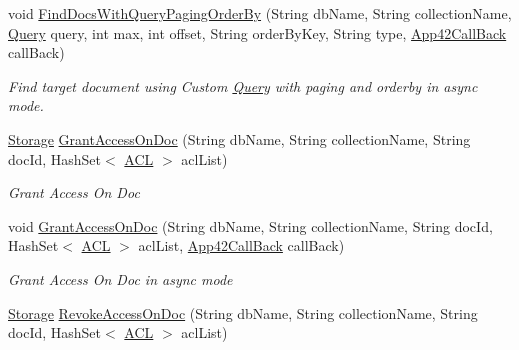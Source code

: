 \begin{DoxyCompactItemize}
void \hyperlink{classcom_1_1shephertz_1_1app42_1_1paas_1_1sdk_1_1csharp_1_1storage_1_1_storage_service_ad7cb126897b5cfe304cfaa0e12b5fb1d}{Find\+Docs\+With\+Query\+Paging\+Order\+By} (String db\+Name, String collection\+Name, \hyperlink{classcom_1_1shephertz_1_1app42_1_1paas_1_1sdk_1_1csharp_1_1storage_1_1_query}{Query} query, int max, int offset, String order\+By\+Key, String type, \hyperlink{interfacecom_1_1shephertz_1_1app42_1_1paas_1_1sdk_1_1csharp_1_1_app42_call_back}{App42\+Call\+Back} call\+Back)
\begin{DoxyCompactList}\small\item\em Find target document using Custom \hyperlink{classcom_1_1shephertz_1_1app42_1_1paas_1_1sdk_1_1csharp_1_1storage_1_1_query}{Query} with paging and orderby in async mode. \end{DoxyCompactList}\item 
\hyperlink{classcom_1_1shephertz_1_1app42_1_1paas_1_1sdk_1_1csharp_1_1storage_1_1_storage}{Storage} \hyperlink{classcom_1_1shephertz_1_1app42_1_1paas_1_1sdk_1_1csharp_1_1storage_1_1_storage_service_a73f8bafa03319566ef4f2f8801e62107}{Grant\+Access\+On\+Doc} (String db\+Name, String collection\+Name, String doc\+Id, Hash\+Set$<$ \hyperlink{classcom_1_1shephertz_1_1app42_1_1paas_1_1sdk_1_1csharp_1_1_a_c_l}{A\+C\+L} $>$ acl\+List)
\begin{DoxyCompactList}\small\item\em Grant Access On Doc \end{DoxyCompactList}\item 
void \hyperlink{classcom_1_1shephertz_1_1app42_1_1paas_1_1sdk_1_1csharp_1_1storage_1_1_storage_service_a85308841633067c2e26c16d51d6cf931}{Grant\+Access\+On\+Doc} (String db\+Name, String collection\+Name, String doc\+Id, Hash\+Set$<$ \hyperlink{classcom_1_1shephertz_1_1app42_1_1paas_1_1sdk_1_1csharp_1_1_a_c_l}{A\+C\+L} $>$ acl\+List, \hyperlink{interfacecom_1_1shephertz_1_1app42_1_1paas_1_1sdk_1_1csharp_1_1_app42_call_back}{App42\+Call\+Back} call\+Back)
\begin{DoxyCompactList}\small\item\em Grant Access On Doc in async mode \end{DoxyCompactList}\item 
\hyperlink{classcom_1_1shephertz_1_1app42_1_1paas_1_1sdk_1_1csharp_1_1storage_1_1_storage}{Storage} \hyperlink{classcom_1_1shephertz_1_1app42_1_1paas_1_1sdk_1_1csharp_1_1storage_1_1_storage_service_a911020eee695751f6eef2227292ab19e}{Revoke\+Access\+On\+Doc} (String db\+Name, String collection\+Name, String doc\+Id, Hash\+Set$<$ \hyperlink{classcom_1_1shephertz_1_1app42_1_1paas_1_1sdk_1_1csharp_1_1_a_c_l}{A\+C\+L} $>$ acl\+List)

\end{DoxyCompactItemize}
